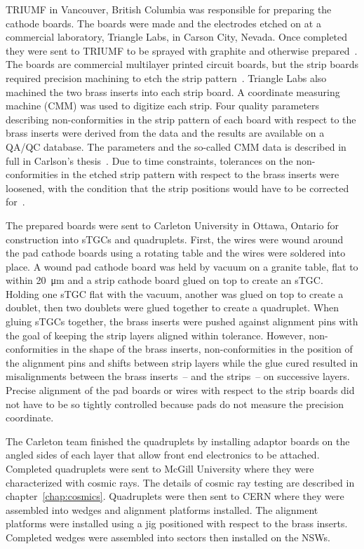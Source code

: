 TRIUMF in Vancouver, British Columbia was responsible for preparing the cathode boards. The boards were made and the electrodes etched on at a commercial laboratory, Triangle Labs, in Carson City, Nevada. Once completed they were sent to TRIUMF to be sprayed with graphite and otherwise prepared~\cite{carlson_results_2019}. The boards are commercial multilayer printed circuit boards, but the strip boards required precision machining to etch the strip pattern~\cite{nsw_tdr}. Triangle Labs also machined the two brass inserts into each strip board. A coordinate measuring machine (CMM) was used to digitize each strip. Four quality parameters describing non-conformities in the strip pattern of each board with respect to the brass inserts were derived from the data and the results are available on a QA/QC database. The parameters and the so-called CMM data is described in full in Carlson's thesis~\cite{carlson_results_2019}.  Due to time constraints, tolerances on the non-conformities in the etched strip pattern with respect to the brass inserts were loosened, with the condition that the strip positions would have to be corrected for~\cite{carlson_results_2019}. 

The prepared boards were sent to Carleton University in Ottawa, Ontario for construction into sTGCs and quadruplets. First, the wires were wound around the pad cathode boards using a rotating table and the wires were soldered into place. A wound pad cathode board was held by vacuum on a granite table, flat to within \SI{20}{\micro\meter} and a strip cathode board glued on top to create an sTGC. Holding one sTGC flat with the vacuum, another was glued on top to create a doublet, then two doublets were glued together to create a quadruplet. When gluing sTGCs together, the brass inserts were pushed against alignment pins with the goal of keeping the strip layers aligned within tolerance. However, non-conformities in the shape of the brass inserts, non-conformities in the position of the alignment pins and shifts between strip layers while the glue cured resulted in misalignments between the brass inserts~-- and the strips~-- on successive layers. Precise alignment of the pad boards or wires with respect to the strip boards did not have to be so tightly controlled because pads do not measure the precision coordinate. 

The Carleton team finished the quadruplets by installing adaptor boards on the angled sides of each layer that allow front end electronics to be attached. Completed quadruplets were sent to McGill University where they were characterized with cosmic rays. The details of cosmic ray testing are described in chapter~\ref{chap:cosmics}. Quadruplets were then sent to CERN where they were assembled into wedges and alignment platforms installed. The alignment platforms were installed using a jig positioned with respect to the brass inserts. Completed wedges were assembled into sectors then installed on the NSWs.

